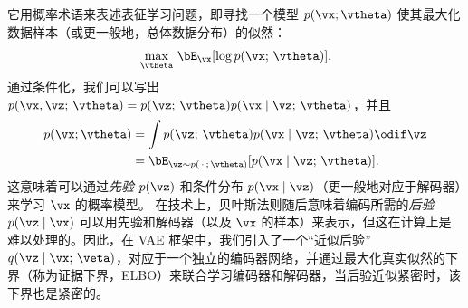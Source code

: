 \documentclass[../../book-main_zh.tex]{subfiles}
\begin{document}
它用概率术语来表述表征学习问题，即寻找一个模型 $p(\vx; \vtheta)$
使其最大化数据样本（或更一般地，总体数据分布）的似然：
\begin{equation*}\label{eq:VAE-MLE}
    \max_{\vtheta}\, \bE_{\vx}[ \log p(\vx;\, \vtheta) ].
\end{equation*}
通过条件化，我们可以写出 $p(\vx, \vz ;\, \vtheta)
= p(\vz;\, \vtheta) p(\vx \mid \vz;\, \vtheta)$，并且
\begin{align*}
    p(\vx; \vtheta) &= \int p(\vz;\, \vtheta) p(\vx \mid \vz;\,
    \vtheta) \odif \vz
    \\
    &=
    \bE_{\vz \sim p(\,\cdot\,;\, \vtheta)}[ p(\vx \mid \vz;\, \vtheta) ].
\end{align*}
%
这意味着可以通过\textit{先验} $p(\vz)$ 和条件分布 $p(\vx \mid \vz)$（更一般地对应于解码器）来学习 $\vx$ 的概率模型。
在技术上，贝叶斯法则随后意味着编码所需的\textit{后验} $p(\vz \mid
\vx)$ 可以用先验和解码器（以及 $\vx$ 的样本）来表示，但这在计算上是难以处理的。因此，在 VAE 框架中，我们引入了一个“近似后验”
$q(\vz \mid \vx;\, \veta)$，对应于一个独立的编码器网络，并通过最大化真实似然的下界（称为证据下界，ELBO）来联合学习编码器和解码器，当后验近似紧密时，该下界也是紧密的。
\end{document}
